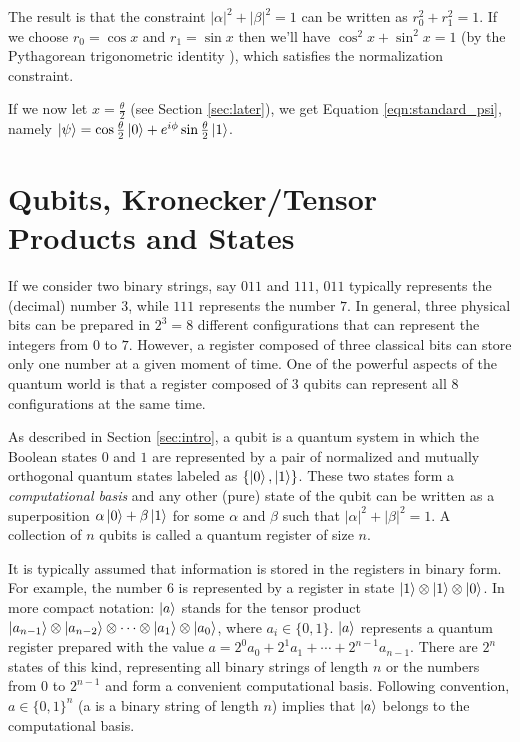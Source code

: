 \documentclass{article}
\theoremstyle{definition}
\begin{document}
\noindent
The result is that the constraint $|\alpha|^2 + |\beta|^2 = 1$
can be written as $ r_0^2 + r_1^2 = 1$.  If we choose $r_0 = \cos
x$ and $r_1 = \sin x$ then we'll have $\cos^2 x+ \sin^2 x= 1$ (by
the Pythagorean trigonometric identity \cite{wiki:trig}), which
satisfies the normalization constraint.

\bigskip
\noindent
If we now let $x = \frac{\theta}{2}$ (see Section
\ref{sec:later}), we get Equation \ref{eqn:standard_psi}, namely
$\ket{\psi} = \cos \frac{\theta}{2} \ket{0} + e^{i \phi} \sin
\frac{\theta}{2} \ket{1}$.


\section{Qubits, Kronecker/Tensor Products and States}

If we consider two binary strings, say $011$ and $111$, $011$
typically represents the (decimal) number $3$, while $111$
represents the number $7$. In general, three physical bits can be
prepared in $2^3 = 8$ different configurations that can represent
the integers from $0$ to $7$. However, a register composed of
three classical bits can store only one number at a given moment
of time.  One of the powerful aspects of the quantum world is
that a register composed of $3$ qubits can represent all $8$
configurations at the same time.

\bigskip
\noindent
As described in Section \ref{sec:intro}, a qubit is a quantum
system in which the Boolean states $0$ and $1$ are represented by
a pair of normalized and mutually orthogonal quantum states
labeled as $\{\ket{0}, \ket{1}\}$.  These two states form a
\emph{computational basis} and any other (pure) state of the
qubit can be written as a superposition $\alpha \ket{0} + \beta
\ket{1}$ for some $\alpha$ and $\beta$ such that $|\alpha|^2 +
|\beta|^2 = 1$.  A collection of $n$ qubits is called a quantum
register of size $n$.

\bigskip
\noindent
It is typically assumed that information is stored in the
registers in binary form. For example, the number $6$ is
represented by a register in state $\ket{1} \otimes \ket{1}
\otimes \ket{0}$.  In more compact notation: $\ket{a}$ stands for
the tensor product $\ket{a_{n-1}} \otimes \ket{a_{n - 2}} \otimes
\cdots \otimes \ket{a_1} \otimes \ket{a_0}$, where $a_i \in
\{0,1\}$.  $\ket{a}$ represents a quantum register prepared with
the value $a = 2^0a_0 + 2^1 a_1 + \cdots + 2^{n - 1}a_{n-1}$.
There are $2^n$ states of this kind, representing all binary
strings of length $n$ or the numbers from 0 to $2^{n - 1}$ and
form a convenient computational basis. Following convention, $a
\in \{0, 1\}^n$ (a is a binary string of length $n$) implies that
$\ket{a}$ belongs to the computational basis.
\end{document}
